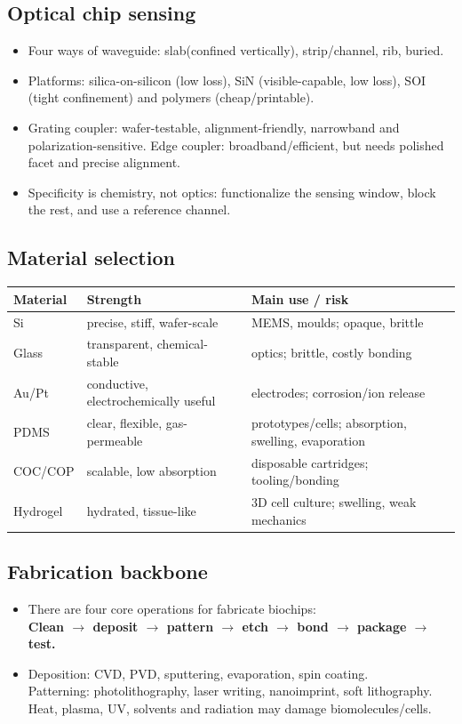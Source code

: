\documentclass[10pt,a4paper]{ctexart}
\newcommand{\key}[1]{\textbf{#1}}
\begin{document}
\begin{multicols*}{2}
\subsection{Optical chip sensing}
\begin{itemize}
	\item Four ways of waveguide: slab(confined vertically), strip/channel, rib, buried.
	\item Platforms: silica-on-silicon (low loss), SiN (visible-capable, low loss), SOI (tight confinement) and polymers (cheap/printable).
	\item Grating coupler: wafer-testable, alignment-friendly, narrowband and polarization-sensitive. 
	Edge coupler: broadband/efficient, but needs polished facet and precise alignment.
	\item Specificity is chemistry, not optics: functionalize the sensing window, block the rest, and use a reference channel.
\end{itemize}

\subsection{Material selection}
\begin{center}\small
\begin{tabularx}{\linewidth}{@{}lYY@{}}
\toprule Material & Strength & Main use / risk\\ \midrule
Si & precise, stiff, wafer-scale & MEMS, moulds; opaque, brittle\\
Glass & transparent, chemical-stable & optics; brittle, costly bonding\\
Au/Pt & conductive, electrochemically useful & electrodes; corrosion/ion release\\
PDMS & clear, flexible, gas-permeable & prototypes/cells; absorption, swelling, evaporation\\
COC/COP & scalable, low absorption & disposable cartridges; tooling/bonding\\
Hydrogel & hydrated, tissue-like & 3D cell culture; swelling, weak mechanics\\
\bottomrule
\end{tabularx}\end{center}

\subsection{Fabrication backbone}
\begin{itemize}
	\item There are four core operations for fabricate biochips:\\
	\key{Clean \(\rightarrow\) deposit \(\rightarrow\) pattern \(\rightarrow\) etch \(\rightarrow\) 
	bond \(\rightarrow\) package \(\rightarrow\) test.}
	\item Deposition: CVD, PVD, sputtering, evaporation, spin coating. \\
	Patterning: photolithography, laser writing, nanoimprint, soft lithography. 
	Heat, plasma, UV, solvents and radiation may damage biomolecules/cells.
\end{itemize}



\end{multicols*}
\end{document}
